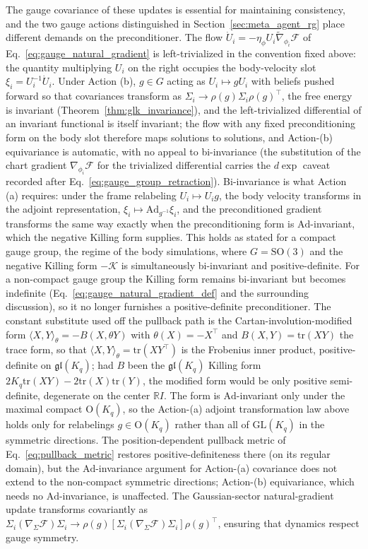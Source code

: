 \documentclass[11pt]{article}
\begin{document}
The gauge covariance of these updates is essential for maintaining consistency, and the two gauge actions distinguished in Section~\ref{sec:meta_agent_rg} place different demands on the preconditioner. The flow $\dot U_i = -\eta_\phi U_i \tilde{\nabla}_{\phi_i}\mathcal{F}$ of Eq.~\eqref{eq:gauge_natural_gradient} is left-trivialized in the convention fixed above: the quantity multiplying $U_i$ on the right occupies the body-velocity slot $\xi_i = U_i^{-1}\dot U_i$. Under Action (b), $g \in G$ acting as $U_i \mapsto g U_i$ with beliefs pushed forward so that covariances transform as $\Sigma_i \to \rho(g) \Sigma_i \rho(g)^\top$, the free energy is invariant (Theorem~\ref{thm:glk_invariance}), and the left-trivialized differential of an invariant functional is itself invariant; the flow with any fixed preconditioning form on the body slot therefore maps solutions to solutions, and Action-(b) equivariance is automatic, with no appeal to bi-invariance (the substitution of the chart gradient $\nabla_{\phi_i}\mathcal{F}$ for the trivialized differential carries the $d\exp$ caveat recorded after Eq.~\eqref{eq:gauge_group_retraction}). Bi-invariance is what Action (a) requires: under the frame relabeling $U_i \mapsto U_i g$, the body velocity transforms in the adjoint representation, $\xi_i \mapsto \mathrm{Ad}_{g^{-1}}\xi_i$, and the preconditioned gradient transforms the same way exactly when the preconditioning form is $\mathrm{Ad}$-invariant, which the negative Killing form supplies. This holds as stated for a compact gauge group, the regime of the body simulations, where $G = \mathrm{SO}(3)$ and the negative Killing form $-\mathcal{K}$ is simultaneously bi-invariant and positive-definite. For a non-compact gauge group the Killing form remains bi-invariant but becomes indefinite (Eq.~\eqref{eq:gauge_natural_gradient_def} and the surrounding discussion), so it no longer furnishes a positive-definite preconditioner. The constant substitute used off the pullback path is the Cartan-involution-modified form $\langle X, Y\rangle_\theta = -B(X, \theta Y)$ with $\theta(X) = -X^\top$ and $B(X, Y) = \mathrm{tr}(XY)$ the trace form, so that $\langle X, Y\rangle_\theta = \mathrm{tr}(XY^\top)$ is the Frobenius inner product, positive-definite on $\mathfrak{gl}(K_q)$; had $B$ been the $\mathfrak{gl}(K_q)$ Killing form $2K_q\mathrm{tr}(XY) - 2\mathrm{tr}(X)\mathrm{tr}(Y)$, the modified form would be only positive semi-definite, degenerate on the center $\mathbb{R}I$. The form is $\mathrm{Ad}$-invariant only under the maximal compact $\mathrm{O}(K_q)$, so the Action-(a) adjoint transformation law above holds only for relabelings $g \in \mathrm{O}(K_q)$ rather than all of $\mathrm{GL}(K_q)$ in the symmetric directions. The position-dependent pullback metric of Eq.~\eqref{eq:pullback_metric} restores positive-definiteness there (on its regular domain), but the $\mathrm{Ad}$-invariance argument for Action-(a) covariance does not extend to the non-compact symmetric directions; Action-(b) equivariance, which needs no $\mathrm{Ad}$-invariance, is unaffected. The Gaussian-sector natural-gradient update transforms covariantly as $\Sigma_i (\nabla_\Sigma \mathcal{F}) \Sigma_i \to \rho(g)[\Sigma_i (\nabla_\Sigma \mathcal{F}) \Sigma_i]\rho(g)^\top$, ensuring that dynamics respect gauge symmetry.
\end{document}
